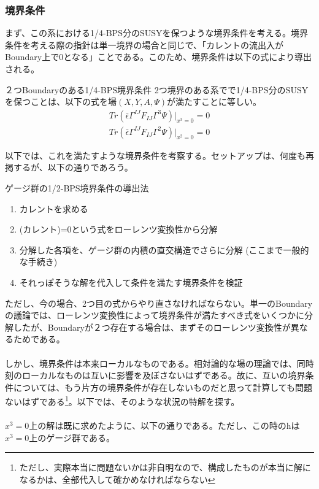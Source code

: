 \documentclass[dvipdfmx,a4paper,10.5pt]{article}
\numberwithin{equation}{section}
\begin{document}
\subsubsection{境界条件}
まず、この系における1/4-BPS分のSUSYを保つような境界条件を考える。境界条件を考える際の指針は単一境界の場合と同じで、「カレントの流出入がBoundary上で0となる」ことである。このため、境界条件は以下の式により導出される。
\begin{defbox}{２つBoundaryのある1/4-BPS境界条件}
    2つ境界のある系でで1/4-BPS分のSUSYを保つことは、以下の式を場$(X,Y,A,\Psi)$が満たすことに等しい。
    \begin{align*}
        Tr(\bar{\epsilon}\Gamma^{IJ}F_{IJ}\Gamma^{3}\Psi)|_{x^{3}=0}=0\\
        Tr(\bar{\epsilon}\Gamma^{IJ}F_{IJ}\Gamma^{2}\Psi)|_{x^{2}=0}=0
    \end{align*}
\end{defbox}
以下では、これを満たすような境界条件を考察する。セットアップは、何度も再掲するが、以下の通りであろう。\\
\begin{setupbox}{ゲージ群の1/2-BPS境界条件の導出法}
\begin{enumerate}
    \item カレントを求める
    \item (カレント)=0という式をローレンツ変換性から分解
    \item 分解した各項を、ゲージ群の内積の直交構造でさらに分解
    (ここまで一般的な手続き)
    \item それっぽそうな解を代入して条件を満たす境界条件を検証
\end{enumerate}
\end{setupbox}
ただし、今の場合、2つ目の式からやり直さなければならない。単一のBoundaryの議論では、ローレンツ変換性によって境界条件が満たすべき式をいくつかに分解したが、Boundaryが２つ存在する場合は、まずそのローレンツ変換性が異なるためである。\\
\\
しかし、境界条件は本来ローカルなものである。相対論的な場の理論では、同時刻のローカルなものは互いに影響を及ぼさないはずである。故に、互いの境界条件については、もう片方の境界条件が存在しないものだと思って計算しても問題ないはずである\footnote{ただし、実際本当に問題ないかは非自明なので、構成したものが本当に解になるかは、全部代入して確かめなければならない}。以下では、そのような状況の特解を探す。\\
\\
$x^{3}=0$上の解は既に求めたように、以下の通りである。ただし、この時のhは$x^{3}=0$上のゲージ群である。
\end{document}
